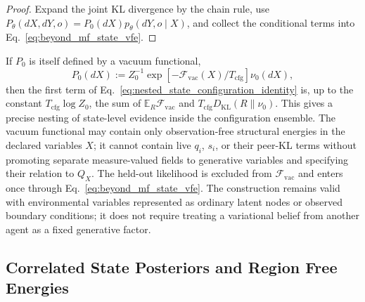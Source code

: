 \documentclass[11pt]{article}
\begin{document}
\begin{proof}
Expand the joint KL divergence by the chain rule, use $P_\theta(dX,dY,o)=P_0(dX)p_\theta(dY,o\mid X)$, and collect the conditional terms into Eq.~\eqref{eq:beyond_mf_state_vfe}.
\end{proof}

If $P_0$ is itself defined by a vacuum functional,
\begin{equation}
P_0(dX)
:=Z_0^{-1}\exp[-\mathcal{F}_{\mathrm{vac}}(X)/T_{\mathrm{cfg}}]\nu_0(dX),
\label{eq:beyond_mf_configuration_prior}
\end{equation}
then the first term of Eq.~\eqref{eq:nested_state_configuration_identity} is, up to the constant $T_{\mathrm{cfg}}\log Z_0$, the sum of $\mathbb{E}_R\mathcal{F}_{\mathrm{vac}}$ and $T_{\mathrm{cfg}}D_{\mathrm{KL}}(R\|\nu_0)$. This gives a precise nesting of state-level evidence inside the configuration ensemble. The vacuum functional may contain only observation-free structural energies in the declared variables $X$; it cannot contain live $q_i$, $s_i$, or their peer-KL terms without promoting separate measure-valued fields to generative variables and specifying their relation to $Q_X$. The held-out likelihood is excluded from $\mathcal{F}_{\mathrm{vac}}$ and enters once through Eq.~\eqref{eq:beyond_mf_state_vfe}. The construction remains valid with environmental variables represented as ordinary latent nodes or observed boundary conditions; it does not require treating a variational belief from another agent as a fixed generative factor.

\subsection{Correlated State Posteriors and Region Free Energies}
\end{document}
